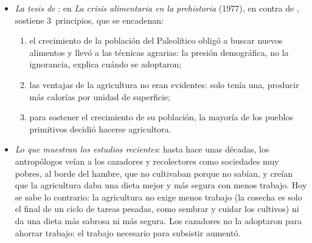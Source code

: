 \documentclass[11pt]{article}
\begin{document}
\begin{itemize}
  \begin{itemize}
  \item \emph{Fue una elección económica, no un accidente}: la humanidad adoptó la agricultura de forma rápida y general en las zonas templadas en cuanto ofreció alguna ventaja sobre la caza y la recolección. Fueron decisiones por prueba y error, con cambios graduales.
  \item \emph{Se conocía antes de aplicarla}: limpiar el terreno, plantar, abonar y regar se sabía hacer mucho antes del 8000~a.\,C. La invención técnica precedió en mucho a la innovación económica, y que la agricultura apareciera a la vez en tantos sitios indica que fue el contexto económico de todo el planeta el que llevó a ella. Los bosquimanos, que conocían la siembra, respondían que hacerse agricultores sería una tontería con tanto alimento silvestre por recoger.
  \end{itemize}
\item \emph{La tesis de }: en \emph{La crisis alimentaria en la prehistoria} (1977), en contra de , sostiene 3~principios, que se encadenan\nocite{Cohen1977Food}:
  \begin{enumerate}
  \item el crecimiento de la población del Paleolítico obligó a buscar nuevos alimentos y llevó a las técnicas agrarias: la presión demográfica, no la ignorancia, explica cuándo se adoptaron;
  \item las ventajas de la agricultura no eran evidentes: solo tenía una, producir más calorías por unidad de superficie;
  \item para sostener el crecimiento de su población, la mayoría de los pueblos primitivos decidió hacerse agricultora.
  \end{enumerate}
\item \emph{Lo que muestran los estudios recientes}: hasta hace unas décadas, los antropólogos veían a los cazadores y recolectores como sociedades muy pobres, al borde del hambre, que no cultivaban porque no sabían, y creían que la agricultura daba una dieta mejor y más segura con menos trabajo. Hoy se sabe lo contrario: la agricultura no exige menos trabajo (la cosecha es solo el final de un ciclo de tareas pesadas, como sembrar y cuidar los cultivos) ni da una dieta más sabrosa ni más segura. Los cazadores no la adoptaron para ahorrar trabajo: el trabajo necesario para subsistir aumentó.
\end{itemize}

\begin{infografia}[H]
\centering
\caption{De los primeros homínidos al comienzo de nuestra era}\label{figu:origenes}
\end{infografia}
\end{document}
